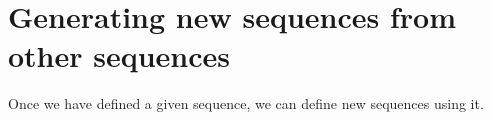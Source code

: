 \documentclass{ximera}
\begin{document}
%
%
%

\section{Generating new sequences from other sequences}

Once we have defined a given sequence, we can define new sequences using it.
\end{document}
